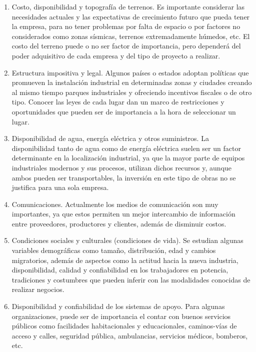 \documentclass[../main]{subfiles}
\begin{document}
\begin{enumerate}
  \item Costo, disponibilidad y topografía de terrenos. Es importante
    considerar las necesidades actuales y las expectativas de crecimiento
    futuro que pueda tener la empresa, para no tener problemas por falta de
    espacio o por factores no considerados como zonas sísmicas, terrenos
    extremadamente húmedos, etc. El costo del terreno puede o no ser factor
    de importancia, pero dependerá del poder adquisitivo de cada empresa y
    del tipo de proyecto a realizar.
  \item  Estructura impositiva y legal. Algunos países o estados adoptan
    políticas que promueven la instalación industrial en determinadas zonas y
    ciudades creando al mismo tiempo parques industriales y ofreciendo
    incentivos fiscales o de otro tipo. Conocer las leyes de cada lugar dan
    un marco de restricciones y oportunidades que pueden ser de
    importancia a la hora de seleccionar un lugar.
  \item Disponibilidad de agua, energía eléctrica y otros suministros. La
    disponibilidad tanto de agua como de energía eléctrica suelen ser un
    factor determinante en la localización industrial, ya que la mayor parte de
    equipos industriales modernos y sus procesos, utilizan dichos recursos y,
    aunque ambos pueden ser transportables, la inversión en este tipo de
    obras no se justifica para una sola empresa.
  \item  Comunicaciones. Actualmente los medios de comunicación son muy
    importantes, ya que estos permiten un mejor intercambio de información
    entre proveedores, productores y clientes, además de disminuir costos.
  \item Condiciones sociales y culturales (condiciones de vida). Se estudian
    algunas variables demográficas como tamaño, distribución, edad y
    cambios migratorios, además de aspectos como la actitud hacia la nueva
    industria, disponibilidad, calidad y confiabilidad en los trabajadores en
    potencia, tradiciones y costumbres que pueden inferir con las
    modalidades conocidas de realizar negocios.
  \item Disponibilidad y confiabilidad de los sistemas de apoyo. Para
    algunas organizaciones, puede ser de importancia el contar con buenos
    servicios públicos como facilidades habitacionales y educacionales,
    caminos-vías de acceso y calles, seguridad pública, ambulancias,
    servicios médicos, bomberos, etc.
\end{enumerate}
\end{document}
